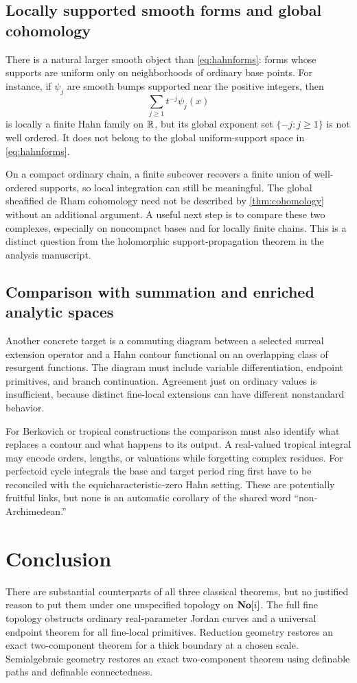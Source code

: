 \documentclass[11pt,letterpaper]{article}
\theoremstyle{definition}
\theoremstyle{remark}
\numberwithin{equation}{section}
\begin{document}
\subsection{Locally supported smooth forms and global cohomology}
There is a natural larger smooth object than \eqref{eq:hahnforms}: forms whose supports are uniform only on neighborhoods of ordinary base points. For instance, if $\psi_j$ are smooth bumps supported near the positive integers, then
\[
 \sum_{j\ge1}t^{-j}\psi_j(x)
\]
is locally a finite Hahn family on $\mathbb R$, but its global exponent set $\{-j:j\ge1\}$ is not well ordered. It does not belong to the global uniform-support space in \eqref{eq:hahnforms}.

On a compact ordinary chain, a finite subcover recovers a finite union of well-ordered supports, so local integration can still be meaningful. The global sheafified de Rham cohomology need not be described by \cref{thm:cohomology} without an additional argument. A useful next step is to compare these two complexes, especially on noncompact bases and for locally finite chains. This is a distinct question from the holomorphic support-propagation theorem in the analysis manuscript.

\subsection{Comparison with summation and enriched analytic spaces}
Another concrete target is a commuting diagram between a selected surreal extension operator and a Hahn contour functional on an overlapping class of resurgent functions. The diagram must include variable differentiation, endpoint primitives, and branch continuation. Agreement just on ordinary values is insufficient, because distinct fine-local extensions can have different nonstandard behavior.

For Berkovich or tropical constructions the comparison must also identify what replaces a contour and what happens to its output. A real-valued tropical integral may encode orders, lengths, or valuations while forgetting complex residues. For perfectoid cycle integrals the base and target period ring first have to be reconciled with the equicharacteristic-zero Hahn setting. These are potentially fruitful links, but none is an automatic corollary of the shared word ``non-Archimedean.''

\section{Conclusion}\label{sec:conclusion}
There are substantial counterparts of all three classical theorems, but no justified reason to put them under one unspecified topology on $\mathbf{No}[i]$. The full fine topology obstructs ordinary real-parameter Jordan curves and a universal endpoint theorem for all fine-local primitives. Reduction geometry restores an exact two-component theorem for a thick boundary at a chosen scale. Semialgebraic geometry restores an exact two-component theorem using definable paths and definable connectedness.
\end{document}
